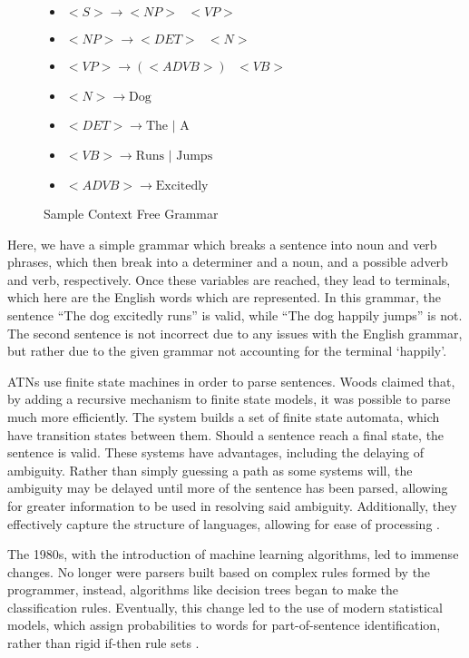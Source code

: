 \begin{center}
\begin{figure}[H]
\begin{center}

\begin{itemize}

	\item $<S> \rightarrow <NP> \text{ } <VP>$
	\item $<NP> \rightarrow <DET> \text{ } <N>$
	\item $<VP> \rightarrow (<ADVB>) \text{ } <VB>$
	\item $<N> \rightarrow \text{Dog}$
	\item $<DET> \rightarrow \text{The | A}$
	\item $<VB> \rightarrow \text{Runs | Jumps}$
	\item $<ADVB> \rightarrow \text{Excitedly}$

\end{itemize}
\end{center}
\caption{Sample Context Free Grammar}
\end{figure}
\end{center}


Here, we have a simple grammar which breaks a sentence into noun and verb phrases, which then break into a determiner and a noun, and a possible adverb and verb, respectively. Once these variables are reached, they lead to terminals, which here are the English words which are represented. In this grammar, the sentence ``The dog excitedly runs'' is valid, while ``The dog happily jumps'' is not. The second sentence is not incorrect due to any issues with the English grammar, but rather due to the given grammar not accounting for the terminal `happily'.

ATNs use finite state machines in order to parse sentences. Woods claimed that, by adding a recursive mechanism to finite state models, it was possible to parse much more efficiently. The system builds a set of finite state automata, which have transition states between them. Should a sentence reach a final state, the sentence is valid. These systems have advantages, including the delaying of ambiguity. Rather than simply guessing a path as some systems will, the ambiguity may be delayed until more of the sentence has been parsed, allowing for greater information to be used in resolving said ambiguity. Additionally, they effectively capture the structure of languages, allowing for ease of processing \cite{ATN}.

The 1980s, with the introduction of machine learning algorithms, led to immense changes. No longer were parsers built based on complex rules formed by the programmer, instead, algorithms like decision trees began to make the classification rules. Eventually, this change led to the use of modern statistical models, which assign probabilities to words for part-of-sentence identification, rather than rigid if-then rule sets \cite{1980}.

